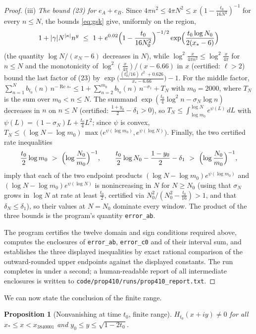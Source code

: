 \documentclass[11pt]{article}
\newtheorem{proposition}[theorem]{Proposition}
\theoremstyle{definition}
\DeclareMathOperator{\Rea}{Re}
\begin{document}
\begin{proof}
(iii) \emph{The bound (23) for $e_A+e_B$.} Since
$4\pi n^2\le4\pi N^2\le x\,(1-\frac{t_0}{16N^2})^{-1}$ for every
$n\le N$, the bounds \eqref{eq:gsk} give, uniformly on the region,
\[
1+|\gamma|N^{|\kappa|}n^y\ \le\
1+e^{0.02}\Bigl(1-\frac{t_0}{16N_0^2}\Bigr)^{-1/2}
\exp\Bigl(\frac{t_0\log N_0}{2(x_*-6)}\Bigr)
\]
(the quantity $\log N/(x_N-6)$ decreases in $N$), while
$\log^2\frac{x}{4\pi n^2}\le\log^2\frac x{4\pi}$ for $n\le N$ and
the monotonicity of $\log^2(\frac x{4\pi})/(x-6.66)$ in $x$
(certified: $\ell>2$) bound the last factor of (23) by
$\exp\bigl(\frac{(t_0^2/16)\ell^2+0.626}{x_*-6.66}\bigr)-1$. For
the middle factor, $\sum_{n=1}^{N}b_{t_0}(n)\,n^{-\Rea s_*}\le
1+\sum_{n=2}^{m_0}b_{t_0}(n)\,n^{-\sigma_1}+T_N$ with $m_0=2000$,
where $T_N$ is the sum over $m_0<n\le N$. The summand
$\exp(\frac{t_0}4\log^2n-\sigma_N\log n)$ decreases in $n$ on
$n\le N$ (certified: $\frac{1+y_0}2-\delta_1>0$), so
$T_N\le\int_{\log m_0}^{\log N}e^{\psi(L)}\,dL$ with
$\psi(L)=(1-\sigma_N)L+\frac{t_0}4L^2$; since $\psi$ is convex,
$T_N\le(\log N-\log m_0)\,
\max\bigl(e^{\psi(\log m_0)},e^{\psi(\log N)}\bigr)$. Finally, the
two certified rate inequalities
\[
\frac{t_0}2\log m_0\ >\ \Bigl(\log\frac{N_0}{m_0}\Bigr)^{-1},
\qquad
\frac{t_0}2\log N_0-\frac{1-y_0}2-\delta_1\ >\
\Bigl(\log\frac{N_0}{m_0}\Bigr)^{-1},
\]
imply that each of the two endpoint products
$(\log N-\log m_0)e^{\psi(\log m_0)}$ and
$(\log N-\log m_0)e^{\psi(\log N)}$ is nonincreasing in $N$ for
$N\ge N_0$ (using that $\sigma_N$ grows in $\log N$ at rate at
least $\frac{t_0}2$, certified via $N_0^2/(N_0^2-\frac{t_0}{16})>1$,
and that $\delta_N\le\delta_1$), so their values at $N=N_0$
dominate every window. The product of the three bounds is the
program's quantity \texttt{error\_ab}.

The program certifies the twelve domain and sign conditions
required above, computes the enclosures of
\texttt{error\_ab}, \texttt{error\_c0} and of their interval sum,
and establishes the three displayed inequalities by exact rational
comparison of the outward-rounded upper endpoints against the
displayed constants. The run completes in under a second; a
human-readable report of all intermediate enclosures is written to
\texttt{code/prop410/runs/prop410\_report.txt}.
\end{proof}

We can now state the conclusion of the finite range.

\begin{proposition}[Nonvanishing at time $t_0$, finite range]
\label{prop:finitelane}
$H_{t_0}(x+iy)\neq0$ for all $x_*\le x<x_{3840001}$ and
$y_0\le y\le\sqrt{1-2t_0}$.
\end{proposition}
\end{document}

